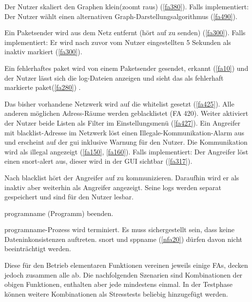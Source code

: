 \begin{description}[style=multiline, leftmargin=4cm, labelwidth=4cm]
   Der Nutzer skaliert den Graphen klein(zoomt raus) (\ref{fa380}). Falls implementiert: Der Nutzer wählt einen alternativen Graph-Darstellungsalgorithmus (\ref{fa490}).
  
   Ein Paketsender wird aus dem Netz entfernt (hört auf zu senden) (\ref{fa300}). Falls implementiert: Er wird nach zuvor vom Nutzer eingestellten 5 Sekunden als inaktiv markiert (\ref{fa300}).
  
   Ein fehlerhaftes \gls{paket} wird von einem Paketsender gesendet, erkannt (\ref{fa10}) und der Nutzer lässt sich die \gls{log}-Dateien anzeigen und sieht das als fehlerhaft markierte \gls{paket}(\ref{fa280}) .
  
   Das bisher vorhandene Netzwerk wird auf die \gls{whitelist} gesetzt (\ref{fa425}). Alle anderen möglichen Adress-Räume werden geblacklistet (FA 420). Weiter aktiviert der Nutzer beide Listen als Filter im Einstellungsmenü (\ref{fa427}). Ein Angreifer mit \gls{blacklist}-Adresse im Netzwerk löst einen Illegale-Kommunikation-Alarm aus und erscheint auf der \gls{gui} inklusive Warnung für den Nutzer. Die Kommunikation wird als illegal angezeigt (\ref{fa150}, \ref{fa160}). Falls implementiert: Der Angreifer löst einen \gls{snort}-\gls{alert} aus, dieser wird in der GUI sichtbar (\ref{fa317}).
  
   Nach \gls{blacklist} hört der Angreifer auf zu kommunizieren. Daraufhin wird er als inaktiv aber weiterhin als Angreifer angezeigt. Seine \glspl{log} werden separat gespeichert und sind für den Nutzer lesbar.
  
   \gls{programname} (Programm) beenden.
  
   \gls{programname}-Prozess wird terminiert. Es muss sichergestellt sein, dass keine Dateninkonsistenzen auftreten. \gls{snort} und \gls{sppname} (\ref{nfa20}) dürfen davon nicht beeinträchtigt werden.

\end{description}

\par
Diese für den Betrieb elementaren Funktionen vereinen jeweils einige FAs, decken jedoch zusammen alle ab. Die nachfolgenden Szenarien sind Kombinationen der obigen Funktionen, enthalten aber jede mindestens einmal. In der Testphase können weitere Kombinationen als Stresstests beliebig hinzugefügt werden.

